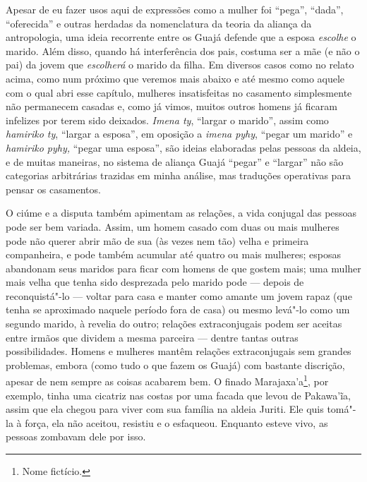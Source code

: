 Apesar de eu fazer usos aqui de expressões como a mulher foi ``pega'',
``dada'', ``oferecida'' e outras herdadas da nomenclatura da teoria da
aliança da antropologia, uma ideia recorrente entre os Guajá defende que
a esposa \emph{escolhe} o marido. Além disso, quando há interferência
dos pais, costuma ser a mãe (e não o pai) da jovem que \emph{escolherá}
o marido da filha. Em diversos casos como no relato acima, como num
próximo que veremos mais abaixo e até mesmo como aquele com o qual abri
esse capítulo, mulheres insatisfeitas no casamento simplesmente não
permanecem casadas e, como já vimos, muitos outros homens já ficaram
infelizes por terem sido deixados. \emph{Imena ty}, ``largar o marido'',
assim como \emph{hamiriko ty}, ``largar a esposa'', em oposição a
\emph{imena pyhy}, ``pegar um marido'' e \emph{hamiriko pyhy,} ``pegar
uma esposa'', são ideias elaboradas pelas pessoas da aldeia, e de muitas
maneiras, no sistema de aliança Guajá ``pegar'' e ``largar'' não são
categorias arbitrárias trazidas em minha análise, mas traduções
operativas para pensar os casamentos.

O ciúme e a disputa também apimentam as relações, a vida conjugal das
pessoas pode ser bem variada. Assim, um homem casado com duas ou mais
mulheres pode não querer abrir mão de sua (às vezes nem tão) velha e
primeira companheira, e pode também acumular até quatro ou mais
mulheres; esposas abandonam seus maridos para ficar com homens de que
gostem mais; uma mulher mais velha que tenha sido desprezada pelo marido
pode --- depois de reconquistá"-lo --- voltar para casa e manter como amante
um jovem rapaz (que tenha se aproximado naquele período fora de casa) ou
mesmo levá"-lo como um segundo marido, à revelia do outro; relações
extraconjugais podem ser aceitas entre irmãos que dividem a mesma
parceira --- dentre tantas outras possibilidades. Homens e mulheres mantêm
relações extraconjugais sem grandes problemas, embora (como tudo o que
fazem os Guajá) com bastante discrição, apesar de nem sempre as coisas
acabarem bem. O finado Marajaxa'a\footnote{Nome fictício.}, por exemplo,
tinha uma cicatriz nas costas por uma facada que levou de Pakawa'ĩa,
assim que ela chegou para viver com sua família na aldeia Juriti. Ele
quis tomá"-la à força, ela não aceitou, resistiu e o esfaqueou. Enquanto
esteve vivo, as pessoas zombavam dele por isso.

